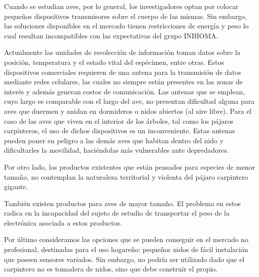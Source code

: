 %

%



Cuando se estudian aves, por lo general, los investigadores optan por colocar pequeños dispositivos transmisores sobre el cuerpo de las mismas. Sin embargo, las soluciones disponibles en el mercado tienen restricciones de energía y peso lo cual resultan incompatibles con las expectativas del grupo INBIOMA.

Actualmente las unidades de recolección de información toman datos sobre la posición, temperatura y el estado vital del espécimen, entre otras. Estos dispositivos comerciales requieren de una antena para la transmisión de datos mediante redes celulares, las cuales no siempre están presentes en las zonas de interés y además generan costos de comunicación. Las antenas que se emplean, cuyo largo es comparable con el largo del ave, no presentan dificultad alguna para aves que duermen y anidan en dormideros o nidos abiertos (al aire libre). Para el caso de las aves que viven en el interior de los árboles, tal como los pájaros carpinteros, el uso de dichos dispositivos es un inconveniente. Estas antenas pueden poner en peligro a las demás aves que habitan dentro del nido y dificultarles la movilidad, haciéndolas más vulnerables ante depredadores.

Por otro lado, los productos existentes que están pensados para especies de menor tamaño, no contemplan la naturaleza territorial y violenta del pájaro carpintero gigante.

También existen productos para aves de mayor tamaño. El problema en estos radica en la incapacidad del sujeto de estudio de transportar el peso de la electrónica asociada a estos productos.

Por último consideramos las opciones que se pueden conseguir en el mercado no profesional, destinadas para el uso hogareño: pequeños nidos de fácil instalación que poseen sensores variados. Sin embargo, no podría ser utilizado dado que el carpintero no es tomadera de nidos, sino que debe construir el propio. 

